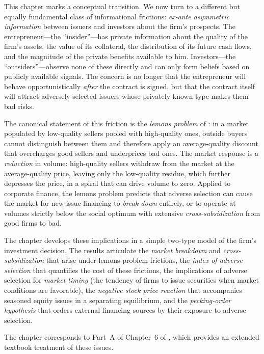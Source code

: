 \documentclass[11pt,a4paper,oneside]{book}
\theoremstyle{plain}
\theoremstyle{definition}
\theoremstyle{remark}
\numberwithin{equation}{chapter}
\begin{document}
This chapter marks a conceptual transition.
We now turn to a different but equally fundamental class of informational frictions: \emph{ex-ante asymmetric information} between issuers and investors about the firm's prospects.
The entrepreneur---the ``insider''---has private information about the quality of the firm's assets, the value of its collateral, the distribution of its future cash flows, and the magnitude of the private benefits available to him.
Investors---the ``outsiders''---observe none of these directly and can only form beliefs based on publicly available signals.
The concern is no longer that the entrepreneur will behave opportunistically \emph{after} the contract is signed, but that the contract itself will attract adversely-selected issuers whose privately-known type makes them bad risks.

The canonical statement of this friction is the \emph{lemons problem} of \citet{Akerlof1970}: in a market populated by low-quality sellers pooled with high-quality ones, outside buyers cannot distinguish between them and therefore apply an average-quality discount that overcharges good sellers and underprices bad ones.
The market response is a \emph{reduction} in volume: high-quality sellers withdraw from the market at the average-quality price, leaving only the low-quality residue, which further depresses the price, in a spiral that can drive volume to zero.
Applied to corporate finance, the lemons problem predicts that adverse selection can cause the market for new-issue financing to \emph{break down} entirely, or to operate at volumes strictly below the social optimum with extensive \emph{cross-subsidization} from good firms to bad.

The chapter develops these implications in a simple two-type model of the firm's investment decision.
The results articulate the \emph{market breakdown} and \emph{cross-subsidization} that arise under lemons-problem frictions, the \emph{index of adverse selection} that quantifies the cost of these frictions, the implications of adverse selection for \emph{market timing} (the tendency of firms to issue securities when market conditions are favorable), the \emph{negative stock price reaction} that accompanies seasoned equity issues in a separating equilibrium, and the \emph{pecking-order hypothesis} that orders external financing sources by their exposure to adverse selection.

The chapter corresponds to Part~A of Chapter~6 of \citet{Tirole2006}, which provides an extended textbook treatment of these issues.
\end{document}
